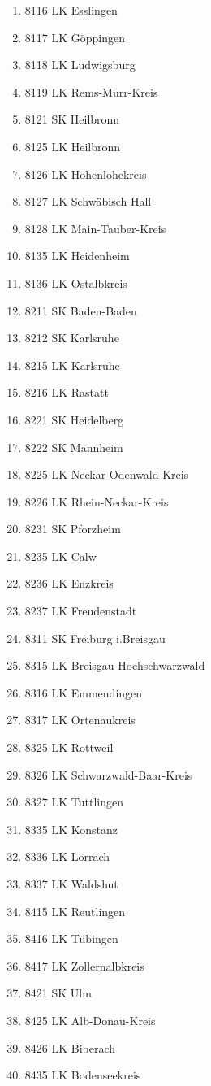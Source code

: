 \begin{enumerate}[itemsep=-6mm]
\item 8116 LK Esslingen
\item 8117 LK Göppingen
\item 8118 LK Ludwigsburg
\item 8119 LK Rems-Murr-Kreis
\item 8121 SK Heilbronn
\item 8125 LK Heilbronn
\item 8126 LK Hohenlohekreis
\item 8127 LK Schwäbisch Hall
\item 8128 LK Main-Tauber-Kreis
\item 8135 LK Heidenheim
\item 8136 LK Ostalbkreis
\item 8211 SK Baden-Baden
\item 8212 SK Karlsruhe
\item 8215 LK Karlsruhe
\item 8216 LK Rastatt
\item 8221 SK Heidelberg
\item 8222 SK Mannheim
\item 8225 LK Neckar-Odenwald-Kreis
\item 8226 LK Rhein-Neckar-Kreis
\item 8231 SK Pforzheim
\item 8235 LK Calw
\item 8236 LK Enzkreis
\item 8237 LK Freudenstadt
\item 8311 SK Freiburg i.Breisgau
\item 8315 LK Breisgau-Hochschwarzwald
\item 8316 LK Emmendingen
\item 8317 LK Ortenaukreis
\item 8325 LK Rottweil
\item 8326 LK Schwarzwald-Baar-Kreis
\item 8327 LK Tuttlingen
\item 8335 LK Konstanz
\item 8336 LK Lörrach
\item 8337 LK Waldshut
\item 8415 LK Reutlingen
\item 8416 LK Tübingen
\item 8417 LK Zollernalbkreis
\item 8421 SK Ulm
\item 8425 LK Alb-Donau-Kreis
\item 8426 LK Biberach
\item 8435 LK Bodenseekreis

\end{enumerate}

